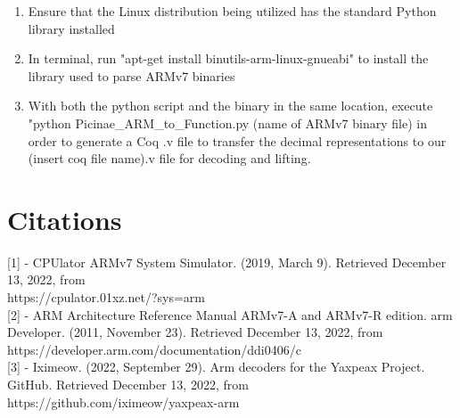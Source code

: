 \documentclass[twocolumn]{article}
\begin{document}
\begin{enumerate}
	\item Ensure that the Linux distribution being utilized has the standard Python library installed
	\item In terminal, run "apt-get install binutils-arm-linux-gnueabi" to install the library used to parse ARMv7 binaries
	\item With both the python script and the binary in the same location, execute "python Picinae\_ARM\_to\_Function.py (name of ARMv7 binary file) in order to generate a Coq .v file to transfer the decimal representations to our (insert coq file name).v file for decoding and lifting.
\\
\end{enumerate}


\section*{\centering Citations}
\vspace{0.3cm}

[1] - CPUlator ARMv7 System Simulator. (2019, March 9). Retrieved December 13, 2022, from \\https://cpulator.01xz.net/?sys=arm\\

[2] - ARM Architecture Reference Manual ARMv7-A and ARMv7-R edition. arm Developer. (2011, November 23). Retrieved December 13, 2022, from https://developer.arm.com/documentation/ddi0406/c\\

[3] - Iximeow. (2022, September 29). Arm decoders for the Yaxpeax Project. GitHub. Retrieved December 13, 2022, from https://github.com/iximeow/yaxpeax-arm
\end{document}
